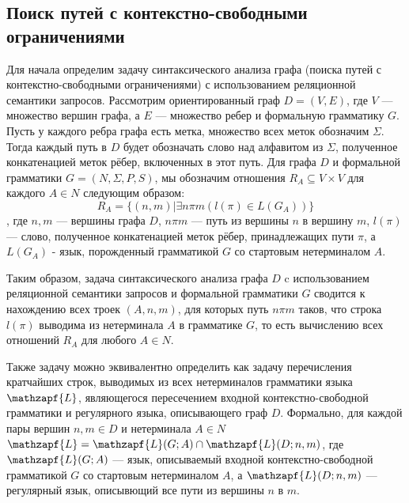 \documentclass{spbau-diploma}
\begin{document}
\subsection{Поиск путей с контекстно-свободными ограничениями}
Для начала определим задачу синтаксического анализа графа (поиска путей с контекстно-свободными ограничениями) с
использованием реляционной семантики запросов.
Рассмотрим ориентированный граф $D = (V, E)$, где $V$ --- множество вершин графа, а $E$ --- множество ребер и
формальную грамматику $G$. Пусть у каждого ребра графа есть
метка, множество всех меток обозначим $\Sigma$. Тогда каждый путь в
$D$ будет обозначать слово над алфавитом из $\Sigma$, полученное
конкатенацией меток рёбер, включенных в этот путь.
Для графа $D$ и формальной грамматики $G = (N, \Sigma, P, S)$, мы
обозначим отношения $R_A \subseteq V\times V$ для каждого $A \in N$ следующим
образом:
\begin{equation}
R_A = \{(n, m) | \exists n\pi m(l(\pi) \in L(G_A)) \}
\end{equation},
где $n, m$ --- вершины графа $D$, $n\pi m$ --- путь из вершины $n$ в вершину $m$, $l(\pi)$ --- слово, полученное
конкатенацией меток рёбер, принадлежащих пути $\pi$, а $L(G_A)$ - язык, порожденный грамматикой $G$ со стартовым нетерминалом $A$.\par
Таким образом, задача синтаксического анализа графа $D$ c
использованием реляционной семантики запросов и формальной
грамматики $G$ сводится к нахождению всех троек $(A, n, m)$, для
которых путь $n\pi m$ таков, что строка $l(\pi)$ выводима из нетерминала
$A$ в грамматике $G$, то есть вычислению всех отношений $R_A$ для
любого $A \in N$.\par
Также задачу можно эквивалентно определить как задачу перечисления кратчайших строк, выводимых из всех нетерминалов грамматики языка $\mathzapf{L}$, являющегося пересечением входной контекстно-свободной грамматики и регулярного языка, описывающего граф $D$. Формально, для каждой пары вершин $n, m \in D$ и нетерминала $A \in N$ $\mathzapf{L} = \mathzapf{L}(G; A) \cap  \mathzapf{L}(D; n, m)$, где $\mathzapf{L}(G; A)$  --- язык, описываемый входной контекстно-свободной грамматикой $G$ со стартовым нетерминалом $A$, а $\mathzapf{L}(D; n, m)$ --- регулярный язык, описывющий все пути из вершины $n$ в $m$.
\end{document}
